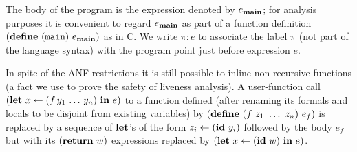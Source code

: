 The body of the program is the expression denoted by $e_{\mathbf{main}}$; for
analysis purposes it is convenient to regard $e_{\mathbf{main}}$ as part of a
function definition $(\mbox{$\mathbf{define}$}\ ({\tt main})\ e_{\mathbf{main}})$ as in C\@.
We write  $\pi\!:\!e$ to  associate the label  $\pi$ (not part  of the
language syntax) with the program point just before expression $e$.

{\color{Myblue}In spite of the ANF  restrictions it is still possible to
  inline non-recursive functions (a fact we use to prove the safety of
  liveness  analysis).  A user-function  call $(\mbox{$\mathbf{ let}$}\,\,  x \leftarrow
  (f\,y_1\,\ldots\,y_n) \,\, \mbox{$\mathbf{ in}$}\,\, e)$  to a function defined (after
  renaming  its  formals  and  locals  to be  disjoint  from  existing
  variables) by $(\DEFINE\ (f\ z_1\ \ldots\ z_n)\ e_f)$ is replaced by
  a  sequence of  $\mbox{$\mathbf{ let}$}$'s  of the  form $z_i\leftarrow  (\mbox{$\mathbf{ id}$}\,\,y_i)$
  followed by the body $e_f$ but with its $(\mbox{$\mathbf{ return}$}\,\,w)$ expressions
  replaced by $(\mbox{$\mathbf{ let}$}\,\, x \leftarrow (\mbox{$\mathbf{ id}$}\,\, w) \,\, \mbox{$\mathbf{ in}$}\,\, e)$.}

